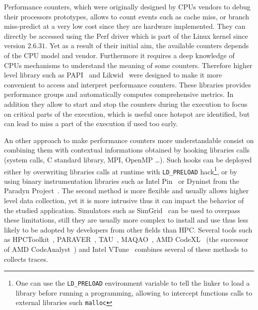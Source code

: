 Performance counters, which were originally designed by \glspl{CPU} vendors to debug their processors prototypes, allows to count events such as cache miss, or branch miss-predict at a very low cost since they are hardware implemented.
They can directly be accessed using the \gls{Perf} driver which is part of the \gls{Linux} kernel since version $2.6.31$.
Yet as a result of their initial aim, the available counters depends of the \gls{CPU} model and vendor.
Furthermore it requires a deep knowledge of \glspl{CPU} mechanisms to understand the meaning of some counters.
Therefore higher level library such as \gls{PAPI}~\cite{Browne00Portable,Malony11Parallel,Weaver13PAPI} and \gls{Likwid}~\cite{Treibig10LIKWID} were designed to make it more convenient to access and interpret performance counters.
These libraries provides performance groups and automatically computes comprehensive metrics.
In addition they allow to start and stop the counters during the execution to focus on critical parts of the execution, which is useful once hotspot are identified, but can lead to miss a part of the execution if used too early.

An other approach to make performance counters more understandable consist on combining them with contextual informations obtained by hooking libraries calls (system calls, C standard library, \gls{MPI}, \gls{OpenMP} \ldots).
Such hooks can be deployed either by overwriting libraries calls at runtime with \texttt{LD\_PRELOAD} hack\footnote{One can use the \texttt{LD\_PRELOAD} environment variable to tell the linker to load a library before running a programming, allowing to intercept functions calls to external libraries such \texttt{malloc}}, or by using binary instrumentation libraries such as \gls{Intel} \gls{Pin}~\cite{Luk05Pin} or Dyninst from the Paradyn Project~\cite{Miller95Paradyn}.
The second method is more flexible and usually allows higher level data collection, yet it is more intrusive thus it can impact the behavior of the studied application.
Simulators such as \gls{SimGrid}~\cite{Casanova14Versatile} can be used to overpass these limitations, still they are usually more complex to install and use thus less likely to be adopted by developers from other fields than \gls{HPC}.
Several tools such as \gls{HPCToolkit}~\cite{Adhianto10HPCTOOLKIT}, \gls{PARAVER}~\cite{Pillet95PARAVER}, \gls{TAU}~\cite{Shende06Tau}, \gls{MAQAO}~\cite{Djoudi05MAQAO}, \gls{AMD} \gls{CodeXL}~\cite{AMD16CodeXL} (the successor of \gls{AMD} \gls{CodeAnalyst}~\cite{Drongowski08introduction}) and \gls{Intel} \gls{VTune}~\cite{Reinders05VTune} combines several of these methods to collects traces.

